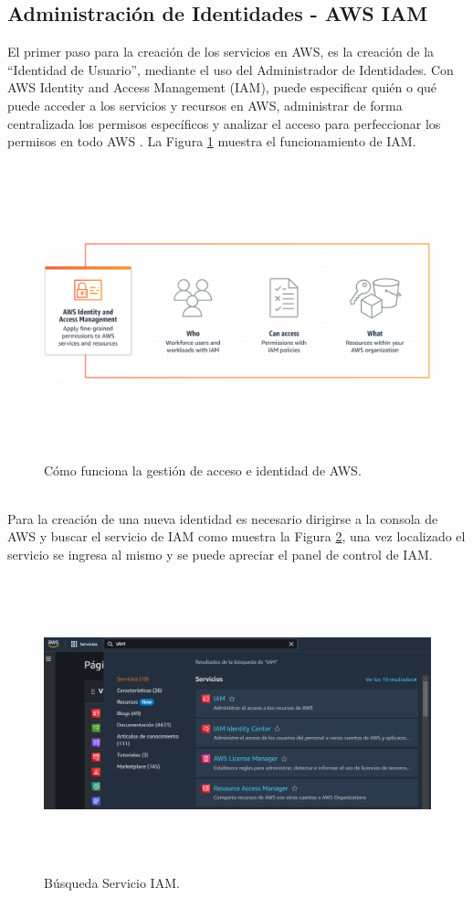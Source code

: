 \documentclass[a4paper,10pt, oneside, titlepage]{article}
\begin{document}
	\subsection{Administración de Identidades - AWS IAM}\label{AWS_IAM}
	El primer paso para la creación de los servicios en AWS, es la creación de la ``Identidad de Usuario'', mediante el uso del Administrador de Identidades. Con AWS Identity and Access Management (IAM), puede especificar quién o qué puede acceder a los servicios y recursos en AWS, administrar de forma centralizada los permisos específicos y analizar el acceso para perfeccionar los permisos en todo AWS \cite{IAM}. La Figura \ref{Funcionamiento_IAM} muestra el funcionamiento de IAM.
	\begin{figure}[!h]
		\centering
		\includegraphics[width = 1\linewidth, height = 8.5cm]{Funcionamiento_IAM.png}
		\caption{Cómo funciona la gestión de acceso e identidad de AWS.}
		\label{Funcionamiento_IAM}
	\end{figure} \\
	\indent Para la creación de una nueva identidad es necesario dirigirse a la consola de AWS y buscar el servicio de IAM como muestra la Figura \ref{Servicio_IAM}, una vez localizado el servicio se ingresa al mismo y se puede apreciar el panel de control de IAM.
	\begin{figure}[!h]
		\centering
		\includegraphics[width = 1\linewidth, height = 8.5cm]{Servicio_IAM.png}
		\caption{Búsqueda Servicio IAM.}
		\label{Servicio_IAM}
	\end{figure} \\
\end{document}
